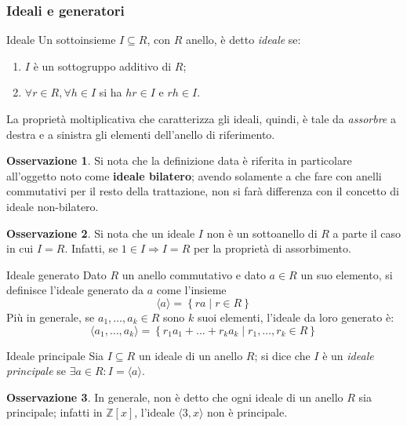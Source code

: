 \documentclass[11pt, a4paper]{scrartcl}
\theoremstyle{definition}
\numberwithin{esempio}{section}
\theoremstyle{definition}
\newtheorem{obs}{Osservazione}
\numberwithin{obs}{section}
\numberwithin{nota}{section}
\numberwithin{equation}{subsection}
\begin{document}
\subsubsection{Ideali e generatori}
\begin{definizione}
	{Ideale}{}
	Un sottoinsieme $I \subseteq R$, con $R$ anello, \`e detto \textit{ideale} se:
	\begin{enumerate}[(D1).]
		\item $I$ \`e un sottogruppo additivo di $R$;
		\item $\forall r \in R, \forall h \in I$ si ha $ hr \in I$ e $rh \in I$.
	\end{enumerate}
\end{definizione}
\noindent La propriet\`a moltiplicativa che caratterizza gli ideali, quindi, \`e tale da \textit{assorbre} a destra e a sinistra gli elementi dell'anello di riferimento.
\begin{obs}
	Si nota che la definizione data \`e riferita in particolare all'oggetto noto come \textbf{ideale bilatero}; avendo solamente a che fare con anelli commutativi per il resto della trattazione, non si far\`a differenza con il concetto di ideale non-bilatero.	
\end{obs}
\begin{obs}
	Si nota che un ideale $I$ non \`e un sottoanello di $R$ a parte il caso in cui $I = R$.
	Infatti, se $1 \in I \Rightarrow  I =R$ per la propriet\`a di assorbimento.
\end{obs}
\begin{definizione}
	{Ideale generato}{}
Dato $R$ un anello commutativo e dato $a \in R$ un suo elemento, si definisce l'ideale generato da $a$ come l'insieme
\[
\langle a \rangle = \left\{ ra  \mid r \in R \right\} 
\] 
Pi\`u in generale, se $a_1,\ldots,a_k \in R$ sono $k$ suoi elementi, l'ideale da loro generato \`e:
\[
\langle a_1,\ldots,a_k \rangle = \left\{ r_1a_1 + \ldots + r_ka_k  \mid r_1, \ldots, r_k \in R \right\} 
\] 
\end{definizione}
\begin{definizione}
	{Ideale principale}{}
	Sia $I \subseteq R$ un ideale di un anello $R$; si dice che $I$ \`e un \textit{ideale principale} se $\exists a \in R : I = \langle a \rangle$.
\end{definizione}
\begin{obs}
	In generale, non \`e detto che ogni ideale di un anello $R$ sia principale; infatti in $\mathbb{Z}[x]$, l'ideale $\langle 3,x \rangle$ non \`e principale.
\end{obs}
\end{document}
